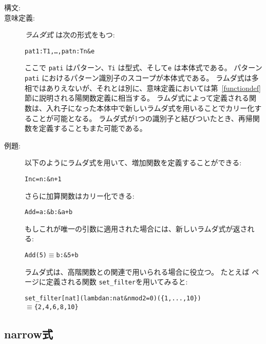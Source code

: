 \documentclass[\pformat,12pt]{jarticle}
\newcommand{\MYEQUIV}{$\equiv$}
\begin{document}
\begin{description}
\item[構文:]



        
\item[意味定義:] {\it ラムダ式} は次の形式をもつ:
  \begin{alltt}
     pat1 : T1, \ldots, patn : Tn \& e
  \end{alltt}
 ここで {\tt pati} はパターン、{\tt Ti} は型式、そして{\tt e} は本体式である。 
パターン{\tt pati} におけるパターン識別子のスコープが本体式である。
ラムダ式は多相ではありえないが、それとは別に、意味定義においては第~\ref{functiondef}節に説明される陽関数定義に相当する。
ラムダ式によって定義される関数は、入れ子になった本体中で新しいラムダ式を用いることでカリー化することが可能となる。
ラムダ式が1つの識別子と結びついたとき、再帰関数を定義することもまた可能である。
\item[例題:] 以下のようにラムダ式を用いて、増加関数を定義することができる:
  \begin{alltt}
    Inc =  n :  \& n + 1
  \end{alltt}
さらに加算関数はカリー化できる:
  \begin{alltt}
    Add =  a :  \&  b :  \& a + b
  \end{alltt}
もしこれが唯一の引数に適用された場合には、新しいラムダ式が返される:
  \begin{alltt}
    Add(5) \(\equiv\)  b :  \& 5 + b
  \end{alltt}
 ラムダ式は、高階関数との関連で用いられる場合に役立つ。
 たとえば \pageref{setfilterdef}ページに定義される関数 \texttt{set\_filter}を用いてみると:
  \begin{alltt}
  set_filter[nat](lambda n:nat & n mod 2 = 0)(\{1,...,10\})
  \MYEQUIV \{2,4,6,8,10\}
  \end{alltt}
\end{description}


\subsection{narrow式}
\label{narrow}
\end{document}
